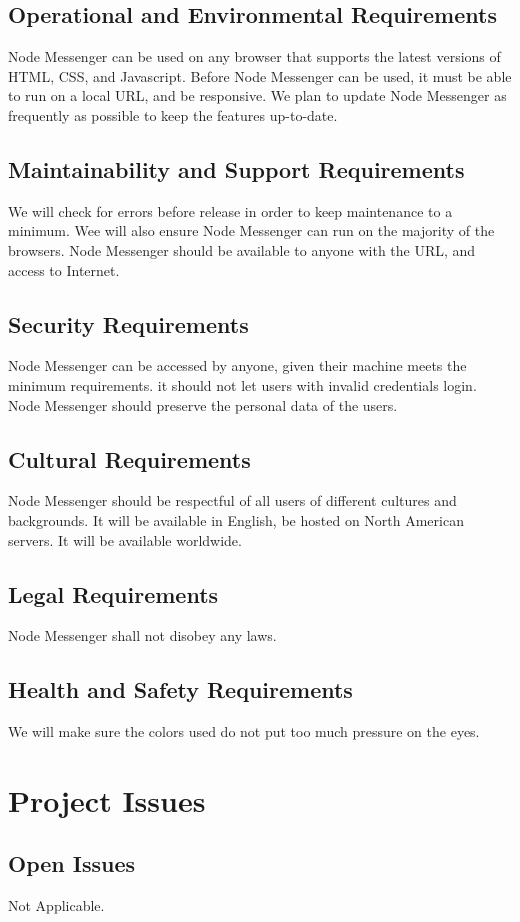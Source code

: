 \documentclass[12pt, titlepage]{article}
\begin{document}
    	\subsection{Operational and Environmental Requirements}
		Node Messenger can be used on any browser that supports the latest versions of HTML, CSS, and Javascript. Before Node Messenger can be used, it must be able to run on a local URL, and be responsive. We plan to update Node Messenger as frequently as possible to keep the features up-to-date.
    	\subsection{Maintainability and Support Requirements}
		We will check for errors before release in order to keep maintenance to a minimum. Wee will also ensure Node Messenger can run on the majority of the browsers. Node Messenger should be available to anyone with the URL, and access to Internet.
    	\subsection{Security Requirements}
		Node Messenger can be accessed by anyone, given their machine meets the minimum requirements. it should not let users with invalid credentials login. Node Messenger should preserve the personal data of the users.
    	\subsection{Cultural Requirements}
		Node Messenger should be respectful of all users of different cultures and backgrounds. It will be available in English, be hosted on North American servers. It will be available worldwide. 
	    \subsection{Legal Requirements}
		Node Messenger shall not disobey any laws.
    	\subsection{Health and Safety Requirements}
		We will make sure the colors used do not put too much pressure on the eyes. 
	
	\newpage
    \section{Project Issues}

    	\subsection{Open Issues}
    	Not Applicable.
\end{document}
